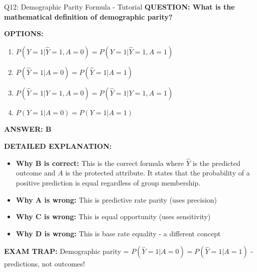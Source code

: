 \documentclass[8pt]{beamer}
\begin{document}
	\begin{frame}{Q12: Demographic Parity Formula - Tutorial}
		\fontsize{6.5}{7.5}\selectfont
		\textbf{QUESTION: What is the mathematical definition of demographic parity?}
		
		\vspace{0.1cm}
		\textbf{OPTIONS:}
		\begin{enumerate}
			\item $P(Y=1|\hat{Y}=1,A=0) = P(Y=1|\hat{Y}=1,A=1)$
			\item $P(\hat{Y}=1|A=0) = P(\hat{Y}=1|A=1)$
			\item $P(\hat{Y}=1|Y=1,A=0) = P(\hat{Y}=1|Y=1,A=1)$
			\item $P(Y=1|A=0) = P(Y=1|A=1)$
		\end{enumerate}
		
		\vspace{0.1cm}
		\textcolor{myblue}{\textbf{ANSWER: B}}
		
		\vspace{0.1cm}
		\textbf{DETAILED EXPLANATION:}
		\begin{itemize}
			\item \textbf{Why B is correct:} This is the correct formula where $\hat{Y}$ is the predicted outcome and $A$ is the protected attribute. It states that the probability of a positive prediction is equal regardless of group membership.
			\item \textbf{Why A is wrong:} This is predictive rate parity (uses precision)
			\item \textbf{Why C is wrong:} This is equal opportunity (uses sensitivity)
			\item \textbf{Why D is wrong:} This is base rate equality - a different concept
		\end{itemize}
		
		\textcolor{myred}{\textbf{EXAM TRAP:}} Demographic parity = \textcolor{myblue}{$P(\hat{Y}=1|A=0) = P(\hat{Y}=1|A=1)$} - predictions, not outcomes!
	\end{frame}
	
\end{document}
